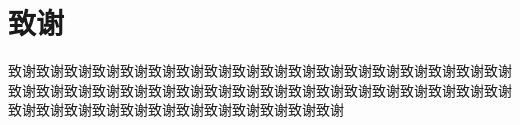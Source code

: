 {\fangsong
	\chapter*{致\qquad 谢}\vskip 2mm
	\vspace{-1cm}
	\large{致谢致谢致谢致谢致谢致谢致谢致谢致谢致谢致谢致谢致谢致谢致谢致谢致谢致谢致谢致谢致谢致谢致谢致谢致谢致谢致谢致谢致谢致谢致谢致谢致谢致谢致谢致谢致谢致谢致谢致谢致谢致谢致谢致谢致谢致谢致谢致谢



%
  

	}
	
	\vspace{0.2cm}
	

}